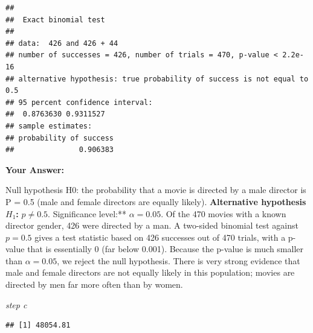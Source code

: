 \documentclass[
]{article}
\newenvironment{Shaded}{\begin{snugshade}}{\end{snugshade}}
\newcommand{\AttributeTok}[1]{\textcolor[rgb]{0.13,0.29,0.53}{#1}}
\newcommand{\CommentTok}[1]{\textcolor[rgb]{0.56,0.35,0.01}{\textit{#1}}}
\newcommand{\ConstantTok}[1]{\textcolor[rgb]{0.56,0.35,0.01}{#1}}
\newcommand{\FloatTok}[1]{\textcolor[rgb]{0.00,0.00,0.81}{#1}}
\newcommand{\FunctionTok}[1]{\textcolor[rgb]{0.13,0.29,0.53}{\textbf{#1}}}
\newcommand{\NormalTok}[1]{#1}
\newcommand{\OtherTok}[1]{\textcolor[rgb]{0.56,0.35,0.01}{#1}}
\newcommand{\SpecialCharTok}[1]{\textcolor[rgb]{0.81,0.36,0.00}{\textbf{#1}}}
\newcommand{\StringTok}[1]{\textcolor[rgb]{0.31,0.60,0.02}{#1}}
\begin{document}
\begin{verbatim}
## 
##  Exact binomial test
## 
## data:  426 and 426 + 44
## number of successes = 426, number of trials = 470, p-value < 2.2e-16
## alternative hypothesis: true probability of success is not equal to 0.5
## 95 percent confidence interval:
##  0.8763630 0.9311527
## sample estimates:
## probability of success 
##               0.906383
\end{verbatim}

\textbf{Your Answer:}

Null hypothesis H0: the probability that a movie is directed by a male
director is P = 0.5 (male and female directors are equally likely).
\textbf{Alternative hypothesis \(H_1\):} \(p \neq 0.5\). Significance
level:** \(\alpha = 0.05\). Of the 470 movies with a known director
gender, 426 were directed by a man. A two-sided binomial test against
\(p = 0.5\) gives a test statistic based on 426 successes out of 470
trials, with a p-value that is essentially 0 (far below 0.001). Because
the p-value is much smaller than \(\alpha = 0.05\), we reject the null
hypothesis. There is very strong evidence that male and female directors
are not equally likely in this population; movies are directed by men
far more often than by women.

\emph{step c}

\begin{Shaded}
\end{Shaded}

\begin{verbatim}
## [1] 48054.81
\end{verbatim}

\begin{Shaded}
\end{Shaded}
\end{document}
